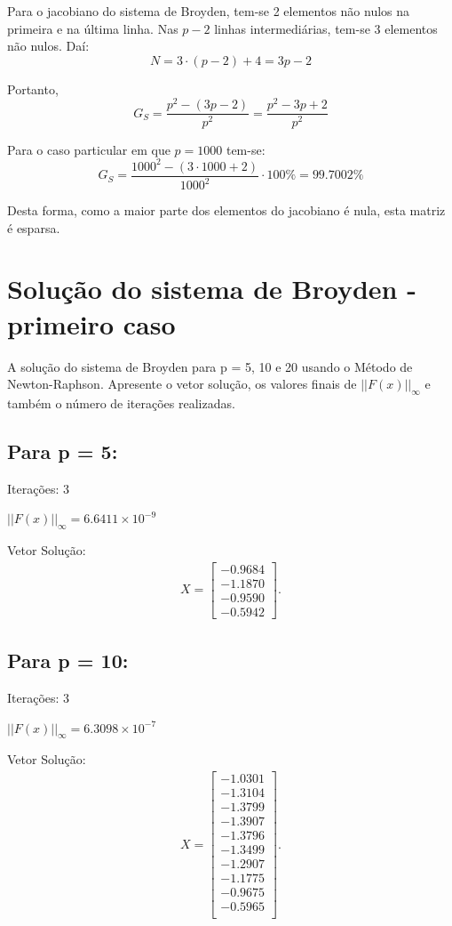 \documentclass[
	12pt,				%
	oneside,			%
	a4paper,			%
	english,			%
	french,				%
	spanish,			%
	brazil				%
	]{abntex2}
\begin{document}
Para o jacobiano do sistema de Broyden, tem-se 2 elementos não nulos na primeira e na última linha. Nas $p-2$ linhas intermediárias, tem-se 3 elementos não nulos. Daí: 
$$N=3\cdot(p-2)+4=3p-2$$

Portanto,
$$G_S=\dfrac{p^2-(3p-2)}{p^2}=\dfrac{p^2-3p+2}{p^2}$$
  
Para o caso particular em que $p=1000$ tem-se: 
$$G_S=\dfrac{1000^2-(3\cdot1000+2)}{1000^2}\cdot100\%=99.7002\%$$

Desta forma, como a maior parte dos elementos do jacobiano é nula, esta matriz é esparsa. 

\newpage
\section{Solução do sistema de Broyden - primeiro caso}
A solução do sistema de Broyden para p = 5, 10 e 20 usando o Método de Newton-Raphson. Apresente o vetor solução, os valores finais de $||F(x)||_\infty$ e também o número de iterações realizadas.
\subsection{Para p = 5:}

Iterações: 3

$||F(x)||_\infty=6.6411\times10^{-9}$

Vetor Solução:
\begin{eqnarray}
      X =
    \begin{bmatrix}
      -0.9684\\
      -1.1870\\
      -0.9590\\
      -0.5942
    \end{bmatrix}.
    \end{eqnarray}
\subsection{Para p = 10:}

Iterações: 3

$||F(x)||_\infty=6.3098\times10^{-7}$

Vetor Solução:
\begin{eqnarray}
      X =
    \begin{bmatrix}
      -1.0301\\
      -1.3104\\
      -1.3799\\
      -1.3907\\
      -1.3796\\
      -1.3499\\
      -1.2907\\
      -1.1775\\
      -0.9675\\
      -0.5965\\
    \end{bmatrix}.
    \end{eqnarray}
\newpage
\end{document}
